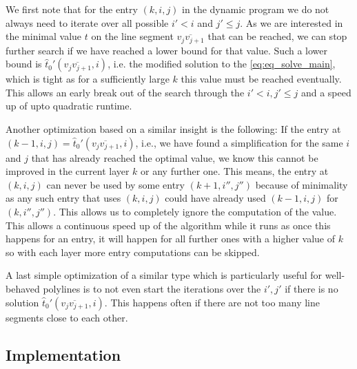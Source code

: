 We first note that for the entry \((k, i, j)\) in the dynamic program we do not always need to iterate over all possible \(i' < i\) and \(j' \leq j\). As we are interested in the minimal value \(t\) on the line segment \(\overline{v_{j}v_{j+1}}\) that can be reached, we can stop further search if we have reached a lower bound for that value. Such a lower bound is \(\hat t_0'(\overline{v_{j}v_{j+1}}, i)\), i.e. the modified solution to the \cref{eq:eq_solve_main}, which is tight as for a sufficiently large \(k\) this value must be reached eventually. This allows an early break out of the search through the \(i' < i, j'\leq j\) and a speed up of upto quadratic runtime. 

Another optimization based on a similar insight is the following: If the entry at \((k-1, i, j) = \hat t_0'(\overline{v_{j}v_{j+1}}, i)\), i.e., we have found a simplification for the same \(i\) and \(j\) that has already reached the optimal value, we know this cannot be improved in the current layer \(k\) or any further one. This means, the entry at \((k, i, j)\) can never be used by some entry \((k + 1, i'', j'')\) because of minimality as any such entry that uses \((k, i, j)\) could have already used \((k-1, i, j)\) for \((k, i'', j'')\). This allows us to completely ignore the computation of the value. This allows a continuous speed up of the algorithm while it runs as once this happens for an entry, it will happen for all further ones with a higher value of \(k\) so with each layer more entry computations can be skipped. 

A last simple optimization of a similar type which is particularly useful for well-behaved polylines is to not even start the iterations over the \(i', j'\) if there is no solution \(\hat t_0'(\overline{v_{j}v_{j+1}}, i)\). This happens often if there are not too many line segments close to each other.












\subsection{Implementation}
\label{subsec:implementation}
%
%


